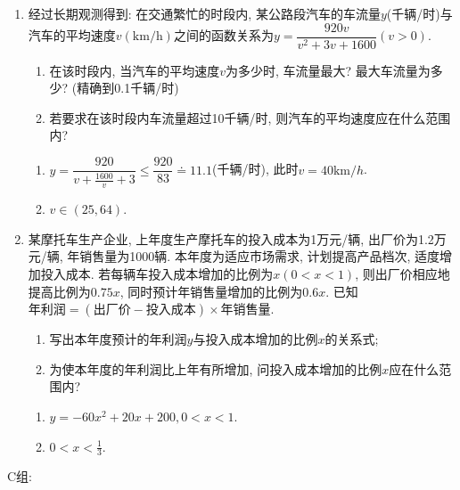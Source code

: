 \begin{enumerate}
\item 经过长期观测得到: 在交通繁忙的时段内, 某公路段汽车的车流量$y$(千辆/时)与汽车的平均速度$v(\si{\km/\hour})$之间的函数关系为$y=\dfrac{920v}{v^2+3v+1600}(v>0)$. 
\begin{enumerate}[(1)]
\item 在该时段内, 当汽车的平均速度$v$为多少时, 车流量最大? 最大车流量为多少? (精确到0.1千辆/时)
\item 若要求在该时段内车流量超过10千辆/时, 则汽车的平均速度应在什么范围内?
\end{enumerate}
\begin{jieda}
\begin{enumerate}[(1)]
\item $y=\dfrac{920}{v+\frac{1600}{v}+3}\leq\dfrac{920}{83}\doteq 11.1$(千辆/时), 此时$v=40\si{\km/h}$. 
\item $v\in(25,64)$. 
\end{enumerate}
\end{jieda}
\begin{vspace_}
\vsp[5]
\end{vspace_}

\item 某摩托车生产企业, 上年度生产摩托车的投入成本为1万元/辆, 出厂价为1.2万元/辆, 年销售量为1000辆. 本年度为适应市场需求, 计划提高产品档次, 适度增加投入成本. 
若每辆车投入成本增加的比例为$x(0<x<1)$, 则出厂价相应地提高比例为$0.75x$, 同时预计年销售量增加的比例为$0.6x$. 
已知$\text{年利润}=(\text{出厂价}-\text{投入成本})\times\text{年销售量}$. 
\begin{enumerate}[(1)]
\item 写出本年度预计的年利润$y$与投入成本增加的比例$x$的关系式; 
\item 为使本年度的年利润比上年有所增加, 问投入成本增加的比例$x$应在什么范围内? 
\end{enumerate}
\begin{jieda}
\begin{enumerate}[(1)]
\item $y=-60x^2+20x+200, 0<x<1$. 
\item $0<x<\frac{1}{3}$. 
\end{enumerate}
\end{jieda}

\begin{vspace_}
\vsp[5]
\end{vspace_}

\end{enumerate}
C组: 
